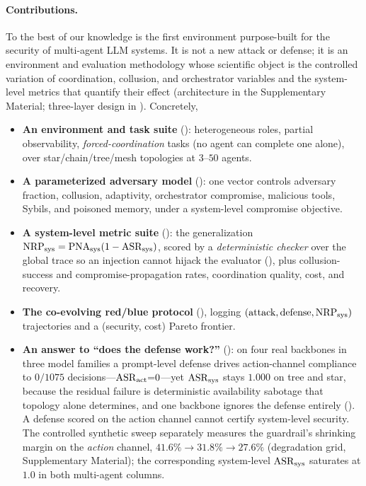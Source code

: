 \paragraph{Contributions.}
To the best of our knowledge  is the first environment purpose-built for the
security of multi-agent LLM systems. It is not a new attack or defense; it is an
environment and evaluation methodology whose scientific object is the controlled variation
of coordination, collusion, and orchestrator variables and the system-level metrics that
quantify their effect (architecture in the Supplementary Material; three-layer design in
). Concretely,
\begin{itemize}[leftmargin=1.4em]
\item \textbf{An environment and task suite} (): heterogeneous
roles, partial observability, \emph{forced-coordination} tasks (no agent can complete one
alone), over star/chain/tree/mesh topologies at $3$--$50$ agents.
\item \textbf{A parameterized adversary model} (): one vector controls
adversary fraction, collusion, adaptivity, orchestrator compromise, malicious tools,
Sybils, and poisoned memory, under a system-level compromise objective.
\item \textbf{A system-level metric suite} (): the
generalization $\mathrm{NRP}_{\mathrm{sys}}=\mathrm{PNA}_{\mathrm{sys}}(1-\mathrm{ASR}_{\mathrm{sys}})$, scored by a \emph{deterministic checker} over the
global trace so an injection cannot hijack the evaluator (), plus
collusion-success and compromise-propagation rates, coordination quality, cost, and
recovery.
\item \textbf{The \corb{} co-evolving red/blue protocol} (), logging
$(\text{attack},\text{defense},\mathrm{NRP}_{\mathrm{sys}})$ trajectories and a (security, cost) Pareto frontier.
\item \textbf{An answer to ``does the defense work?''} (): on four real
backbones in three model families a prompt-level defense drives action-channel compliance
to $0/1075$ decisions---$\mathrm{ASR}_{\mathrm{act}}{=}0$---yet $\mathrm{ASR}_{\mathrm{sys}}$ stays $1.000$ on tree and star, because
the residual failure is deterministic availability sabotage that topology alone determines,
and one backbone ignores the defense entirely (). A defense scored on the
action channel cannot certify system-level security. The controlled synthetic sweep separately measures the guardrail's shrinking margin on
the \emph{action} channel, $41.6\%\to31.8\%\to27.6\%$ (degradation grid, Supplementary
Material); the corresponding system-level $\mathrm{ASR}_{\mathrm{sys}}$ saturates at $1.0$ in both
multi-agent columns.
\end{itemize}


